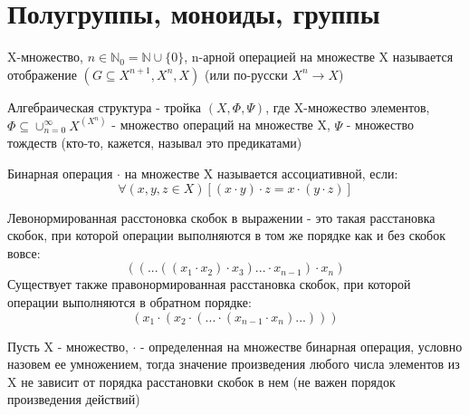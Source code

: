 \section{Полугруппы, моноиды, группы}

\begin{Def}
	X-множество, $n \in {\mathbb{N}}_0 = \mathbb{N}\cup\{0\}$, n-арной операцией на множестве X называется отображение $\left(G \subseteq X^{n+1}, X^n, X\right)$ (или по-русски $X^n \rightarrow X$)
\end{Def}

\begin{Def}
	Алгебраическая структура - тройка $(X, \Phi, \Psi)$, где X-множество элементов, $\Phi \subseteq \cup_{n=0}^{\infty} X^{\left(X^n\right)}$ - множество операций на множестве X, $\Psi$ - множество тождеств (кто-то, кажется, называл это предикатами)
\end{Def}

\begin{Def}
	Бинарная операция $\cdot$ на множестве X называется ассоциативной, если: \[ \forall(x,y,z \in X) \left[ \left( x \cdot y \right) \cdot z =  x \cdot \left( y \cdot z \right) \right] \]
\end{Def}

\begin{Def}
	Левонормированная расстоновка скобок в выражении - это такая расстановка скобок, при которой операции выполняются в том же порядке как и без скобок вовсе:
	\[
		\left(\left( ... \left( \left( x_1 \cdot x_2 \right) \cdot x_3 \right) ... \cdot x_{n-1} \right) \cdot x_n \right)
	\]
	Существует также правонормированная расстановка скобок, при которой операции выполняются в обратном порядке:
	\[
		\left(x_1 \cdot \left( x_2 \cdot \left( ... \cdot \left( x_{n-1} \cdot x_n \right) ... \right) \right) \right)
	\]
\end{Def}

\begin{Th}
	Пусть X - множество, $\cdot$ - определенная на множестве бинарная операция, условно назовем ее умножением, тогда значение произведения любого числа элементов из X не зависит от порядка расстановки скобок в нем (не важен порядок произведения действий)
\end{Th}

